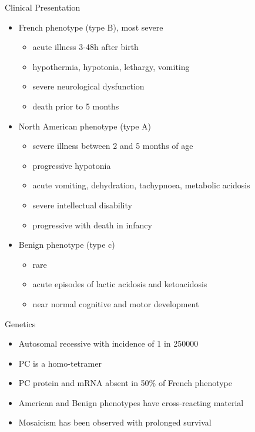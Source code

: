 \documentclass[presentation, smaller]{beamer}
\begin{document}
\begin{frame}[label={sec:org3f40c4d}]{Clinical Presentation}
\begin{itemize}
\item French phenotype (type B), most severe
\begin{itemize}
\item acute illness 3-48h after birth
\item hypothermia, hypotonia, lethargy, vomiting
\item severe neurological dysfunction
\item death prior to 5 months
\end{itemize}
\item North American phenotype (type A)
\begin{itemize}
\item severe illness between 2 and 5 months of age
\item progressive hypotonia
\item acute vomiting, dehydration, tachypnoea, metabolic acidosis
\item severe intellectual disability
\item progressive with death in infancy
\end{itemize}
\item Benign phenotype (type c)
\begin{itemize}
\item rare
\item acute episodes of lactic acidosis and ketoacidosis
\item near normal cognitive and motor development
\end{itemize}
\end{itemize}
\end{frame}
\begin{frame}[label={sec:orgc4b6996}]{Genetics}
\begin{itemize}
\item Autosomal recessive with incidence of 1 in 250000
\item PC is a homo-tetramer
\item PC protein and mRNA absent in 50\% of French phenotype
\item American and Benign phenotypes have cross-reacting material
\item Mosaicism has been observed with prolonged survival
\end{itemize}
\end{frame}
\end{document}
